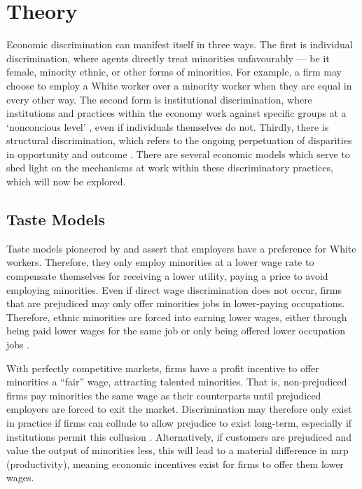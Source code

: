 \documentclass[class=article, crop=false]{standalone}
\begin{document}
\section{Theory}
\label{sec:Theory}
Economic discrimination can manifest itself in three ways. The first is individual discrimination, where agents directly treat minorities unfavourably --- be it female, minority ethnic, or other forms of minorities. For example, a firm may choose to employ a White worker over a minority worker when they are equal in every other way. The second form is institutional discrimination, where institutions and practices within the economy work against specific groups at a \enquote*{nonconcious level} \cite[p.~1814]{Ian}, even if individuals themselves do not. Thirdly, there is structural discrimination, which refers to the ongoing perpetuation of disparities in opportunity and outcome \citep{Lawrence}. There are several economic models which serve to shed light on the mechanisms at work within these discriminatory practices, which will now be explored.

\subsection{Taste Models}
\label{sec:Human Capital Models}
Taste models pioneered by \citet{Becker} and \citet{Arrow} assert that employers have a preference for White workers. Therefore, they only employ minorities at a lower wage rate to compensate themselves for receiving a lower utility, paying a price to avoid employing minorities. Even if direct wage discrimination does not occur, firms that are prejudiced may only offer minorities jobs in lower-paying occupations. Therefore, ethnic minorities are forced into earning lower wages, either through being paid lower wages for the same job or only being offered lower occupation jobs \citep{Coate}.

With perfectly competitive markets, firms have a profit incentive to offer minorities a \enquote{fair} wage, attracting talented minorities. That is, non-prejudiced firms pay minorities the same wage as their counterparts until prejudiced employers are forced to exit the market. Discrimination may therefore only exist in practice if firms can collude to allow prejudice to exist long-term, especially if institutions permit this collusion \citep{LundbergB}. Alternatively, if customers are prejudiced and value the output of minorities less, this will lead to a material difference in \acrshort{mrp} (productivity), meaning economic incentives exist for firms to offer them lower wages.
\end{document}
